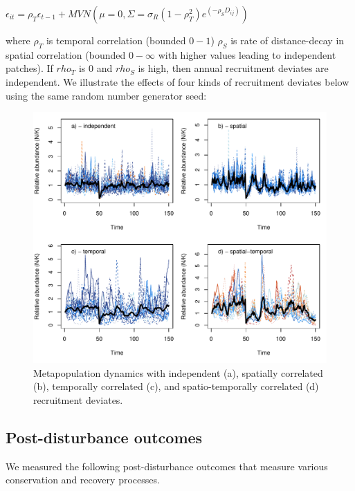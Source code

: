 \documentclass[]{article}
\begin{document}
\(\epsilon_{it}=\rho_T\epsilon_{t-1}+MVN(\mu=0,\Sigma=\sigma_R(1-\rho_T^2)e^{(-\rho_SD_{ij})})\)

where \(\rho_T\) is temporal correlation (bounded \(0-1\)) \(\rho_S\) is
rate of distance-decay in spatial correlation (bounded \(0-\infty\) with
higher values leading to independent patches). If \(rho_T\) is 0 and
\(rho_S\) is high, then annual recruitment deviates are independent. We
illustrate the effects of four kinds of recruitment deviates below using
the same random number generator seed:

\begin{figure}[H]

{\centering \includegraphics{Managing_for_ecological_surprises_in_metapopulations_makeHTML_files/figure-latex/independent stochasticity-1} 

}

\caption{Metapopulation dynamics with independent (a), spatially correlated (b), temporally correlated (c), and spatio-temporally correlated (d) recruitment deviates.}\label{fig:independent stochasticity}
\end{figure}

\hypertarget{post-disturbance-outcomes}{%
\subsection{Post-disturbance outcomes}\label{post-disturbance-outcomes}}

We measured the following post-disturbance outcomes that measure various
conservation and recovery processes.
\end{document}
